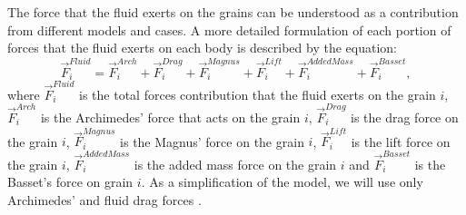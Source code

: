 \label{subsubchap:Fluido}
    The force that the fluid exerts on the grains can be understood as a contribution from different models and cases. A more detailed formulation of each portion of forces that the fluid exerts on each body is described by the equation:
\begin{equation}
    \vec{F}_{i}^{Fluid} = \vec{F}_{i}^{Arch} +\vec{F}_{i}^{Drag} +\vec{F}_{i}^{Magnus} +\vec{F}_{i}^{Lift} +\vec{F}_{i}^{AddedMass} +\vec{F}_{i}^{Basset},
    \label{equ:forcas_fluido}
\end{equation}
where $\vec{F}_{i}^{Fluid}$ is the total forces contribution that the fluid exerts on the grain $i$, $\vec{F}_{i}^{Arch}$ is the Archimedes' force that acts on the grain $i$, $\vec{F}_{i}^{Drag}$ is the drag force on the grain $i$, $\vec{F}_{i}^{Magnus}$ is the Magnus' force on the grain $i$, $\vec{F}_{i}^{Lift}$ is the lift force on the grain $i$, $\vec{F}_{i}^{AddedMass}$ is the added mass force on the grain $i$ and $\vec{F}_{i}^{Basset}$ is the Basset's force on grain $i$. As a simplification of the model, we will use only Archimedes' and fluid drag forces \cite{Fluid_Mechanics, Numerical_simulation_of_turbulent_sediment_transport, Maurin-Tese}.


